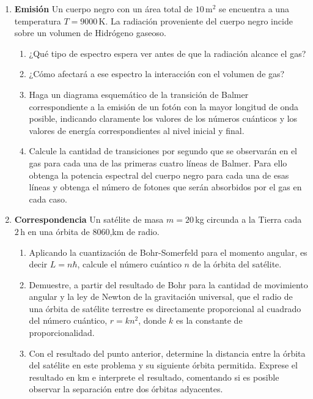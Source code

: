\documentclass[a4paper,12pt]{article}
\begin{document}
\begin{enumerate}
\item {\bf{Emisión}}
	Un cuerpo negro con un área total de $10$\,m$^2$ se encuentra a una
		temperatura $T=9000$\,K. La radiación proveniente del cuerpo negro
		incide sobre un volumen de Hidrógeno gaseoso.
		\begin{enumerate}
			\item ¿Qué tipo de espectro espera ver antes de que la radiación
				alcance el gas?
			\item ¿Cómo afectará a ese espectro la interacción con el volumen
				de gas?
			\item Haga un diagrama esquemático de la transición de Balmer
				correspondiente a la emisión de un fotón con la mayor longitud
				de onda posible, indicando claramente los valores de los
				números cuánticos y los valores de energía correspondientes al
				nivel inicial y final.
			\item Calcule la cantidad de transiciones por segundo que se
				observarán en el gas para cada una de las primeras cuatro
				líneas de Balmer.  Para ello obtenga la potencia espectral del
				cuerpo negro para cada una de esas líneas y obtenga el número
				de fotones que serán absorbidos por el gas en cada caso.
		\end{enumerate}

\item {\bf{Correspondencia}}
	Un satélite de masa $m=20$\,kg circunda a la Tierra cada $2$\,h en una
		órbita de $8060$,km de radio. 
	\begin{enumerate}
		\item Aplicando la cuantización de Bohr-Somerfeld para el momento
			angular, es decir $L=n\hbar$, calcule el número cuántico $n$ de la
			órbita del satélite.
		\item Demuestre, a partir del resultado de Bohr para la cantidad de
			movimiento angular y la ley de Newton de la gravitación universal,
			que el radio de una órbita de satélite terrestre es directamente
			proporcional al cuadrado del número cuántico, $r=k n^2$, donde $k$
			es la constante de proporcionalidad. 
		\item Con el resultado del punto anterior, determine la distancia entre
			la órbita del satélite en este problema y su siguiente órbita
			permitida. Exprese el resultado en km e interprete el resultado,
			comentando si es posible observar la separación entre dos órbitas
			adyacentes. 
	\end{enumerate}
\end{enumerate}
\end{document}
